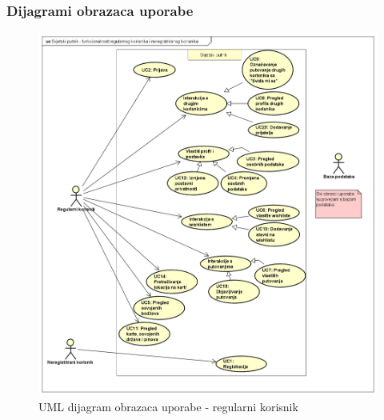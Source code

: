 					
					
					
				\subsubsection{Dijagrami obrazaca uporabe}
					
        				\begin{figure}[H]
                			\includegraphics[scale=0.4]{slike/UC-regularnikorisnik-alt.png} %
                			\centering
                			\caption{UML dijagram obrazaca uporabe - regularni korisnik}
                			
                		\end{figure}
                		
